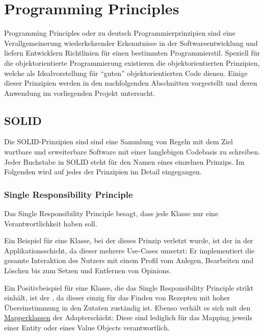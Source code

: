 \chapter{Programming Principles}
Programming Principles oder zu deutsch Programmierprinzipien sind eine Verallgemeinerung wiederkehrender Erkenntnisse in der Softwareentwicklung und liefern Entwicklern Richtlinien für einen bestimmten Programmierstil. Speziell für die objektorientierte Programmierung existieren die objektorientierten Prinzipien, welche als Idealvorstellung für \enquote{guten} objektorientierten Code dienen. Einige dieser Prinzipien werden in den nachfolgenden Abschnitten vorgestellt und deren Anwendung im vorliegenden Projekt untersucht.

\section{SOLID}
Die SOLID-Prinzipien sind sind eine Sammlung von Regeln mit dem Ziel wartbare und erweiterbare Software mit einer langlebigen Codebasis zu schreiben. Jeder Buchstabe in SOLID steht für den Namen eines einzelnen Prinzips. Im Folgenden wird auf jedes der Prinzipien im Detail eingegangen.

\subsection{Single Responsibility Principle}
Das Single Responsibility Principle besagt, dass jede Klasse nur eine Verantwortlichkeit haben soll. 

Ein Beispiel für eine Klasse, bei der dieses Prinzip verletzt wurde, ist der \href{https://github.com/anditru/quickie/blob/bb41442c7f1ffbfcd3117cd86a40f7932e543a33/2-quickie-application/src/main/java/org/pinkcrazyunicorn/quickie/application/profile/ProfileService.java}{} in der Applikationsschicht, da dieser mehrere Use-Cases umsetzt: Er implementiert die gesamte Interaktion des Nutzers mit einem Profil vom Anlegen, Bearbeiten und Löschen bis zum Setzen und Entfernen von Opinions.

Ein Positivbeispiel für eine Klasse, die das Single Responsibility Principle strikt einhält, ist der \href{https://github.com/anditru/quickie/blob/bb41442c7f1ffbfcd3117cd86a40f7932e543a33/2-quickie-application/src/main/java/org/pinkcrazyunicorn/quickie/application/recipe/MatchingService.java}{}, da dieser einzig für das Finden von Rezepten mit hoher Übereinstimmung in den Zutaten zuständig ist. Ebenso verhält es sich mit den \href{https://github.com/anditru/quickie/tree/bb41442c7f1ffbfcd3117cd86a40f7932e543a33/1-quickie-adapters/src/main/java/org/pinkcrazyunicorn/quickie/adapters/mappers}{Mapperklassen} der Adapterschicht: Diese sind lediglich für das Mapping jeweils einer Entity oder eines Value Objects verantwortlich.

